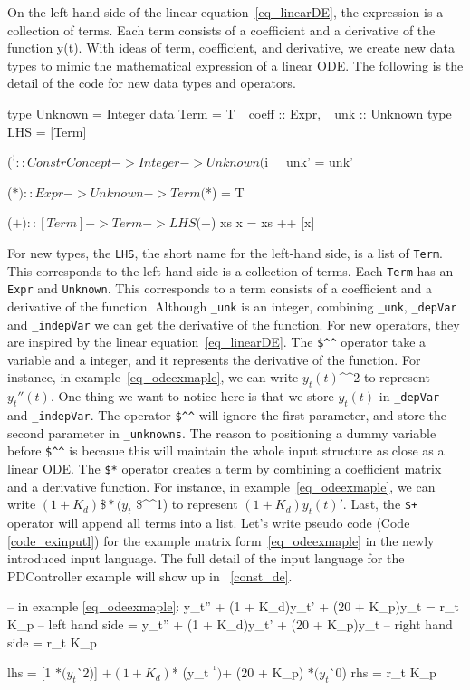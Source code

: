 On the left-hand side of the linear equation~\ref{eq_linearDE}, the expression is a collection of terms. Each term consists of a coefficient and a derivative of the function y(t). With ideas of term, coefficient, and derivative, we create new data types to mimic the mathematical expression of a linear ODE. The following is the detail of the code for new data types and operators.

\begin{haskell1}
type Unknown = Integer
data Term = T{
	_coeff :: Expr,
	_unk :: Unknown
}
type LHS = [Term]

($^^) :: ConstrConcept -> Integer -> Unknown
($^^) _ unk' = unk'

($*) :: Expr -> Unknown -> Term
($*) = T

($+) :: [Term] -> Term -> LHS
($+) xs x  = xs ++ [x]
\end{haskell1}

For new types, the \verb|LHS|, the short name for the left-hand side, is a list of \verb|Term|. This corresponds to the left hand side is a collection of terms. Each \verb|Term| has an \verb|Expr| and \verb|Unknown|. This corresponds to a term consists of a coefficient and a derivative of the function. Although \verb|_unk| is an integer, combining \verb|_unk|, \verb|_depVar| and \verb|_indepVar| we can get the derivative of the function. For new operators, they are inspired by the linear equation~\ref{eq_linearDE}. The \verb|$^^| operator take a variable and a integer, and it represents the derivative of the function. For instance, in example~\ref{eq_odeexmaple}, we can write $y_t(t)$\^{}\^{}2 to represent $y_t''(t)$. One thing we want to notice here is that we store $y_t(t)$ in \verb|_depVar| and \verb|_indepVar|. The operator \verb|$^^| will ignore the first parameter, and store the second parameter in \verb|_unknowns|. The reason to positioning a dummy variable before \verb|$^^| is becasue this will maintain the whole input structure as close as a linear ODE. The \verb|$*| operator creates a term by combining a coefficient matrix and a derivative function. For instance, in example~\ref{eq_odeexmaple}, we can write $(1 + K_d) \$* (y_t$ \$\^{}\^{}1) to represent $(1 + K_d)y_t(t)'$. Last, the \verb|$+| operator will append all terms into a list. Let's write pseudo code (Code \ref{code_exinputl}) for the example matrix form~\ref{eq_odeexmaple} in the newly introduced input language. The full detail of the input language for the PDController example will show up in ~\ref{const_de}.

\begin{listing}[ht]
\begin{haskell1}
-- in example \ref{eq_odeexmaple}: y\_t'' + (1 + K\_d)y\_t' + (20 + K\_p)y\_t = r\_t K\_p
-- left hand side = y\_t'' + (1 + K\_d)y\_t' + (20 + K\_p)y\_t 
-- right hand side = r\_t K\_p

lhs = [1 $* (y_t $^^ 2)]
	$+ (1 + K_d) $* (y_t $^^ 1)
	$+ (20 + K_p) $* (y_t $^^ 0)
rhs = r_t K_p
\end{haskell1}
\label{code_exinputl}
\end{listing}

